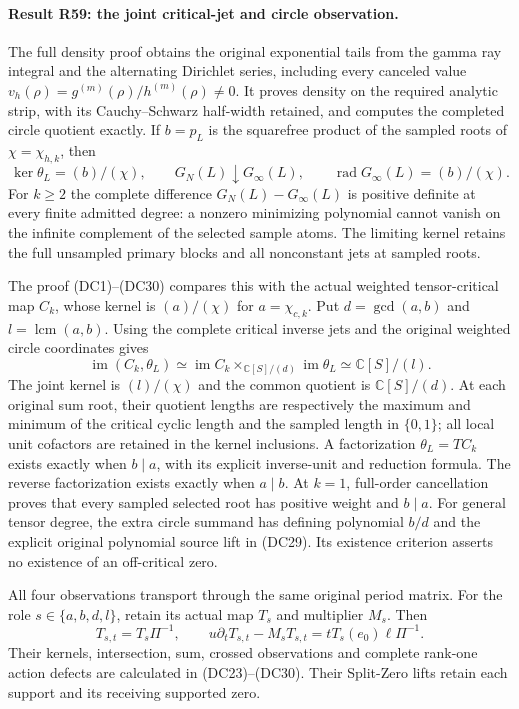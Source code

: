 \paragraph{Result R59: the joint critical-jet and circle observation.}
The full density proof obtains the original exponential tails from
the gamma ray integral and the alternating Dirichlet series, including
every canceled value $v_h(\rho)=g^{(m)}(\rho)/h^{(m)}(\rho)\ne0$.
It proves density on the required analytic strip, with its
Cauchy--Schwarz half-width retained, and computes the completed circle
quotient exactly. If $b=p_L$ is the squarefree product of the sampled
roots of $\chi=\chi_{h,k}$, then
\[
 \ker\theta_L=(b)/(\chi),\qquad
 G_N(L)\downarrow G_\infty(L),\qquad
 \operatorname{rad}G_\infty(L)=(b)/(\chi).
\]
For $k\ge2$ the complete difference $G_N(L)-G_\infty(L)$ is
positive definite at every finite admitted degree: a nonzero
minimizing polynomial cannot vanish on the infinite complement of
the selected sample atoms. The limiting kernel retains the full
unsampled primary blocks and all nonconstant jets at sampled roots.

The proof (DC1)--(DC30) compares this with the actual weighted
tensor-critical map $C_k$, whose kernel is $(a)/(\chi)$ for
$a=\chi_{c,k}$. Put $d=\gcd(a,b)$ and $l=\operatorname{lcm}(a,b)$.
Using the complete critical inverse jets and the original weighted
circle coordinates gives
\[
 \operatorname{im}(C_k,\theta_L)
   \simeq\operatorname{im}C_k
        \mathop{\times}_{\mathbb C[S]/(d)}\operatorname{im}\theta_L
   \simeq\mathbb C[S]/(l).
\]
The joint kernel is $(l)/(\chi)$ and the common quotient is
$\mathbb C[S]/(d)$. At each original sum root, their quotient
lengths are respectively the maximum and minimum of the critical
cyclic length and the sampled length in $\{0,1\}$; all local unit
cofactors are retained in the kernel inclusions. A factorization
$\theta_L=T C_k$ exists exactly when $b\mid a$, with its explicit
inverse-unit and reduction formula. The reverse factorization exists
exactly when $a\mid b$. At $k=1$, full-order cancellation proves
that every sampled selected root has positive weight and $b\mid a$.
For general tensor degree, the extra circle summand has defining
polynomial $b/d$ and the explicit original polynomial source lift
in (DC29). Its existence criterion asserts no existence of an
off-critical zero.

All four observations transport through the same original period
matrix. For the role $s\in\{a,b,d,l\}$, retain its actual map $T_s$
and multiplier $M_s$. Then
\[
 T_{s,t}=T_s\Pi^{-1},\qquad
 u\partial_tT_{s,t}-M_sT_{s,t}
       =tT_s(e_0)\ell\Pi^{-1}.
\]
Their kernels, intersection, sum, crossed observations and complete
rank-one action defects are calculated in (DC23)--(DC30). Their
Split-Zero lifts retain each support and its receiving supported zero.

